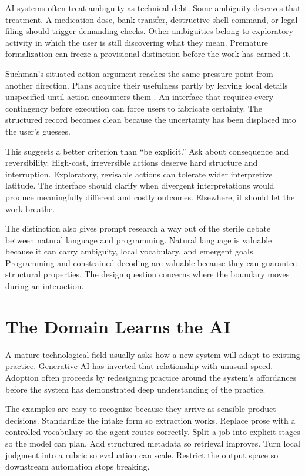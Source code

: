 \documentclass[11pt]{article}
\begin{document}
AI systems often treat ambiguity as technical debt. Some ambiguity deserves that treatment. A medication dose, bank transfer, destructive shell command, or legal filing should trigger demanding checks. Other ambiguities belong to exploratory activity in which the user is still discovering what they mean. Premature formalization can freeze a provisional distinction before the work has earned it.

Suchman's situated-action argument reaches the same pressure point from another direction. Plans acquire their usefulness partly by leaving local details unspecified until action encounters them \citep{suchman1987plans}. An interface that requires every contingency before execution can force users to fabricate certainty. The structured record becomes clean because the uncertainty has been displaced into the user's guesses.

This suggests a better criterion than ``be explicit.'' Ask about consequence and reversibility. High-cost, irreversible actions deserve hard structure and interruption. Exploratory, revisable actions can tolerate wider interpretive latitude. The interface should clarify when divergent interpretations would produce meaningfully different and costly outcomes. Elsewhere, it should let the work breathe.

The distinction also gives prompt research a way out of the sterile debate between natural language and programming. Natural language is valuable because it can carry ambiguity, local vocabulary, and emergent goals. Programming and constrained decoding are valuable because they can guarantee structural properties. The design question concerns where the boundary moves during an interaction.

\section{The Domain Learns the AI}

A mature technological field usually asks how a new system will adapt to existing practice. Generative AI has inverted that relationship with unusual speed. Adoption often proceeds by redesigning practice around the system's affordances before the system has demonstrated deep understanding of the practice.

The examples are easy to recognize because they arrive as sensible product decisions. Standardize the intake form so extraction works. Replace prose with a controlled vocabulary so the agent routes correctly. Split a job into explicit stages so the model can plan. Add structured metadata so retrieval improves. Turn local judgment into a rubric so evaluation can scale. Restrict the output space so downstream automation stops breaking.
\end{document}
